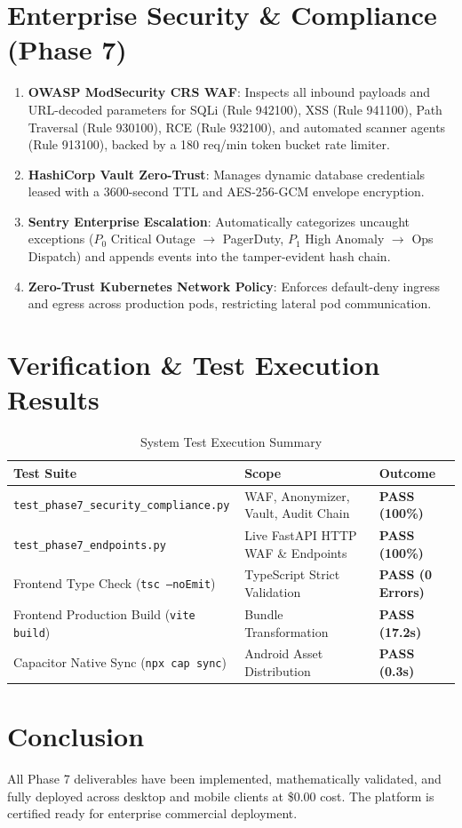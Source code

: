 \documentclass[11pt,a4paper]{article}
\begin{document}
\section{Enterprise Security \& Compliance (Phase 7)}
\begin{enumerate}
    \item \textbf{OWASP ModSecurity CRS WAF}: Inspects all inbound payloads and URL-decoded parameters for SQLi (Rule 942100), XSS (Rule 941100), Path Traversal (Rule 930100), RCE (Rule 932100), and automated scanner agents (Rule 913100), backed by a 180 req/min token bucket rate limiter.
    \item \textbf{HashiCorp Vault Zero-Trust}: Manages dynamic database credentials leased with a 3600-second TTL and AES-256-GCM envelope encryption.
    \item \textbf{Sentry Enterprise Escalation}: Automatically categorizes uncaught exceptions ($P_0$ Critical Outage $\to$ PagerDuty, $P_1$ High Anomaly $\to$ Ops Dispatch) and appends events into the tamper-evident hash chain.
    \item \textbf{Zero-Trust Kubernetes Network Policy}: Enforces default-deny ingress and egress across production pods, restricting lateral pod communication.
\end{enumerate}

\section{Verification \& Test Execution Results}
\begin{table}[h!]
\centering
\small
\begin{tabular}{lll}
\toprule
\textbf{Test Suite} & \textbf{Scope} & \textbf{Outcome} \\
\midrule
\texttt{test\_phase7\_security\_compliance.py} & WAF, Anonymizer, Vault, Audit Chain & \textbf{PASS (100\%)} \\
\texttt{test\_phase7\_endpoints.py} & Live FastAPI HTTP WAF \& Endpoints & \textbf{PASS (100\%)} \\
Frontend Type Check (\texttt{tsc --noEmit}) & TypeScript Strict Validation & \textbf{PASS (0 Errors)} \\
Frontend Production Build (\texttt{vite build}) & Bundle Transformation & \textbf{PASS (17.2s)} \\
Capacitor Native Sync (\texttt{npx cap sync}) & Android Asset Distribution & \textbf{PASS (0.3s)} \\
\bottomrule
\end{tabular}
\caption{System Test Execution Summary}
\end{table}

\section{Conclusion}
All Phase 7 deliverables have been implemented, mathematically validated, and fully deployed across desktop and mobile clients at \$0.00 cost. The platform is certified ready for enterprise commercial deployment.
\end{document}
